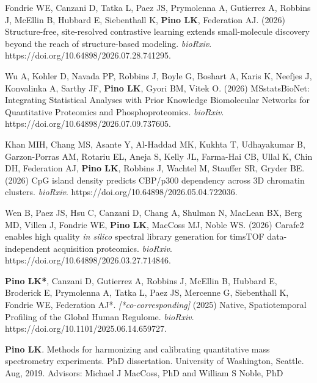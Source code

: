 \documentclass[11pt]{article}
\begin{document}
\begin{etaremune}

    \item Fondrie WE, Canzani D, Tatka L, Paez JS, Prymolenna A, Gutierrez A, Robbins J, McEllin B, Hubbard E, Siebenthall K, \textbf{Pino LK}, Federation AJ. (2026) Structure-free, site-resolved contrastive learning extends small-molecule discovery beyond the reach of structure-based modeling. \textit{bioRxiv}. https://doi.org/10.64898/2026.07.28.741295.

    \item Wu A, Kohler D, Navada PP, Robbins J, Boyle G, Boshart A, Karis K, Neefjes J, Konvalinka A, Sarthy JF, \textbf{Pino LK}, Gyori BM, Vitek O. (2026) MSstatsBioNet: Integrating Statistical Analyses with Prior Knowledge Biomolecular Networks for Quantitative Proteomics and Phosphoproteomics. \textit{bioRxiv}. https://doi.org/10.64898/2026.07.09.737605.

    \item Khan MIH, Chang MS, Asante Y, Al-Haddad MK, Kukhta T, Udhayakumar B, Garzon-Porras AM, Rotariu EL, Aneja S, Kelly JL, Farma-Hai CB, Ullal K, Chin DH, Federation AJ, \textbf{Pino LK}, Robbins J, Wachtel M, Stauffer SR, Gryder BE. (2026) CpG island density predicts CBP/p300 dependency across 3D chromatin clusters. \textit{bioRxiv}. https://doi.org/10.64898/2026.05.04.722036.

    \item Wen B, Paez JS, Hsu C, Canzani D, Chang A, Shulman N, MacLean BX, Berg MD, Villen J, Fondrie WE, \textbf{Pino LK}, MacCoss MJ, Noble WS. (2026) Carafe2 enables high quality \textit{in silico} spectral library generation for timsTOF data-independent acquisition proteomics. \textit{bioRxiv}. https://doi.org/10.64898/2026.03.27.714846.

    \item \textbf{Pino LK*}, Canzani D, Gutierrez A, Robbins J, McEllin B, Hubbard E, Broderick E, Prymolenna A, Tatka L, Paez JS, Mercenne G, Siebenthall K, Fondrie WE, Federation AJ*. \textit{[*co-corresponding]} (2025) Native, Spatiotemporal Profiling of the Global Human Regulome. \textit{bioRxiv}. https://doi.org/10.1101/2025.06.14.659727.

\end{etaremune}

\begin{etaremune}
  \item {\bf Pino LK}. Methods for harmonizing and calibrating quantitative mass spectrometry 
  experiments. PhD dissertation. University of Washington, Seattle. Aug, 2019. Advisors: 
  Michael J MacCoss, PhD and William S Noble, PhD
\end{etaremune}
\end{document}
